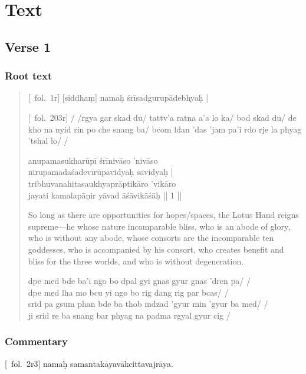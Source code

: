 \documentclass[12pt]{article}
\newcommand{\emdash} {\hspace{0em}—\hspace{0em}}
\begin{document}
\section{Text}
\subsection{Verse 1}
\subsubsection{Root text}
\begin{quote}
	[\MS\ fol.\ 1r] [siddhaṃ]\footnoteB{
		[siddhaṃ]] \MS ; oṁ \EDD
	} namaḥ śrīsadgurupādebhyaḥ |
	
	[\TM\ fol.\ 203r] / /rgya gar skad du/ tattv'a ratna a'a lo ka/ bod skad du/ de kho na nyid rin po che snang ba/ bcom ldan 'das 'jam pa'i rdo rje la phyag 'tshal lo/ /

	anupamasukharūpī śrīnivāso 'nivāso \\
	nirupamadaśadevīrūpavidyaḥ\footnoteB{
		nirupama°] \EDD\ ; nirūpama° \MS
	} savidyaḥ |\\
	tribhuvanahitasaukhyaprāptikāro 'vikāro \\
	jayati kamalapāṇir yāvad āśāvikāśāḥ\footnoteB{
		āśāvikāśāḥ] \corr ; āśāvikāsāḥ \MS\ \EDD
	} || 1 ||
	
	So long as there are opportunities for hopes/spaces, the Lotus Hand reigns supreme\emdash he whose nature incomparable bliss, who is an abode of glory, who is without any abode, whose consorts are the incomparable ten goddesses, who is accompanied by his consort, who creates benefit and bliss for the three worlds, and who is without degeneration.
	
	dpe med bde ba'i ngo bo dpal gyi gnas gyur gnas 'dren pa/ /\\
	dpe med lha mo bcu yi ngo bo rig dang rig par bcas/ /\\
	srid pa gsum phan bde ba thob mdzad 'gyur min 'gyur ba med/ /\\
	ji srid re ba snang bar phyag na padma rgyal gyur cig /
\end{quote}

\subsubsection{Commentary}
[\MS\ fol.\ 2r3] namaḥ samantakāyavākcittavajrāya.\\
\end{document}
